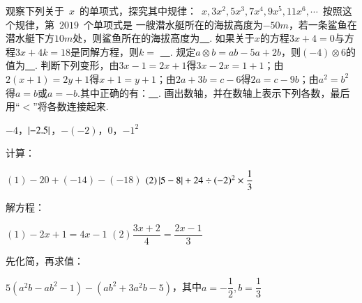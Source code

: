 \documentclass[10pt]{BHCexam}
\begin{document}
\begin{questions}
\begin{center}
\end{center}

\qs 观察下列关于~$x$~的单项式，探究其中规律：~$x,3x^2,5x^3,7x^4,9x^5,11x^6,\cdots$~按照这个规律，第~$2019$~个单项式是\xx
{}
\vspace{-2EM}
\tiankong
\qs 一艘潜水艇所在的海拔高度为$-50m$，若一条鲨鱼在潜水艇下方$10m$处，则鲨鱼所在的海拔高度为\underline{~\hspace{2cm}~}.
\qs 如果关于$x$的方程$3x+4=0$与方程$3x+4k=18$是同解方程，则$k=$ \underline{~\hspace{2cm}~}.
\qs 规定$a\otimes b=ab-5a+2b$，则$(-4)\otimes 6$的值为\underline{~\hspace{2cm}~}.
\qs 判断下列变形，由$3x-1=2x+1$得$3x-2x=1+1$；由$2(x+1)=2y+1$得$x+1=y+1$；由$2a+3b=c-6$得$2a=c-9b$；由$a^2=b^2$得$a=b$或$a=-b$.其中正确的有：\underline{~\hspace{2cm}~}.
\jianda
{}画出数轴，并在数轴上表示下列各数，最后用“$<$”将各数连接起来.
\begin{parts}
$-4$，$\left| -2.5 \right|$，$-(-2)$，$0$，$-1^2$
\end{parts}
\vspace{3cm}

计算：
\begin{parts}
$(1)-20+(-14)-(-18)$ \hspace{2cm}  $(2)\left| 5-8 \right|+24\div (-2)^2\times \dfrac{1}{3}$
\end{parts}
\vspace{3cm}

解方程：
\begin{parts}
$(1)-2x+1=4x-1$ \hspace{3cm}  $(2)\dfrac{3x+2}{4}=\dfrac{2x-1}{3}$
\end{parts}
\vspace{3cm}

先化简，再求值：
\begin{parts}
$5(a^2b-ab^2-1)-(ab^2+3a^2b-5)$，其中$a=-\dfrac{1}{2},b=\dfrac{1}{3}$
\end{parts}


\end{questions}
\end{document}
